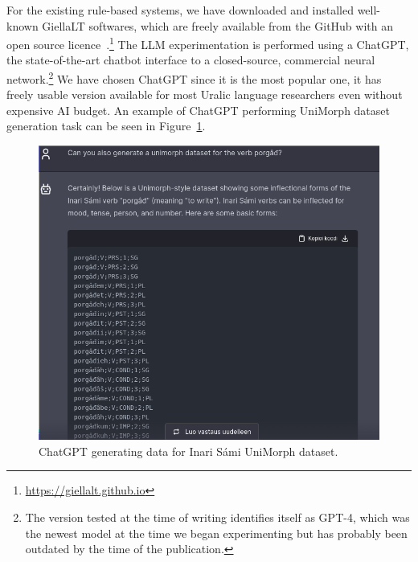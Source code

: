 \documentclass[free]{flammie}
\begin{document}
For the existing rule-based systems, we have downloaded and installed well-known
GiellaLT softwares, which are freely available from the GitHub with an open
source
licence~\cite{pirinen2023giellalt}.\footnote{\url{https://giellalt.github.io}}
The LLM experimentation is performed using a ChatGPT, the state-of-the-art
chatbot interface to a closed-source, commercial neural network.\footnote{The
version tested at the time of writing identifies itself as GPT-4, which was the
newest model at the time we began experimenting but has probably been outdated
by the time of the publication.} We have chosen ChatGPT since it is the most
popular one, it has freely usable version available for most Uralic language
researchers even without expensive AI budget.  An example of ChatGPT performing
UniMorph dataset generation task can be seen in Figure~\ref{fig:chatuit}.

\begin{figure}
    \centering
    \includegraphics[width=\columnwidth]{chatuit.png}
    \caption{ChatGPT generating data for Inari Sámi UniMorph dataset.\label{fig:chatuit}}
\end{figure}
\end{document}
